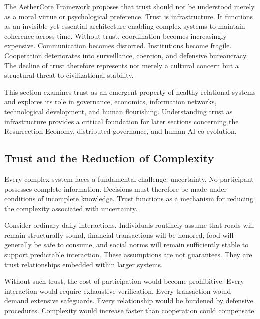 \documentclass[12pt]{article}
\begin{document}
The AetherCore Framework proposes that trust should not be understood merely as a moral virtue or psychological preference. Trust is infrastructure. It functions as an invisible yet essential architecture enabling complex systems to maintain coherence across time. Without trust, coordination becomes increasingly expensive. Communication becomes distorted. Institutions become fragile. Cooperation deteriorates into surveillance, coercion, and defensive bureaucracy. The decline of trust therefore represents not merely a cultural concern but a structural threat to civilizational stability.

This section examines trust as an emergent property of healthy relational systems and explores its role in governance, economics, information networks, technological development, and human flourishing. Understanding trust as infrastructure provides a critical foundation for later sections concerning the Resurrection Economy, distributed governance, and human-AI co-evolution.


\subsection{Trust and the Reduction of Complexity}

Every complex system faces a fundamental challenge: uncertainty. No participant possesses complete information. Decisions must therefore be made under conditions of incomplete knowledge. Trust functions as a mechanism for reducing the complexity associated with uncertainty.

Consider ordinary daily interactions. Individuals routinely assume that roads will remain structurally sound, financial transactions will be honored, food will generally be safe to consume, and social norms will remain sufficiently stable to support predictable interaction. These assumptions are not guarantees. They are trust relationships embedded within larger systems.

Without such trust, the cost of participation would become prohibitive. Every interaction would require exhaustive verification. Every transaction would demand extensive safeguards. Every relationship would be burdened by defensive procedures. Complexity would increase faster than cooperation could compensate.
\end{document}
